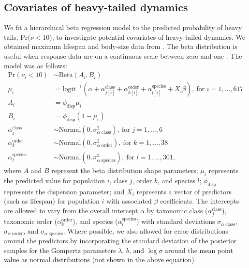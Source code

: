 \subsection{Covariates of heavy-tailed dynamics} We fit a hierarchical beta
regression model to the predicted probability of heavy tails, Pr(\(\nu < 10\)),
to investigate potential covariates of heavy-tailed dynamics. We obtained
maximum lifespan and body-size data from \citet{brook2006a}.
The beta distribution is useful when response data are on a continuous scale
between zero and one \citep{ferrari2004}. The model was as follows:
\begin{align}
\mathrm{Pr}(\nu_i < 10) &\sim \mathrm{Beta}(A_i, B_i)\\
\mu_i &= \mathrm{logit}^{-1}(\alpha
  + \alpha^\mathrm{class}_{j[i]}
  + \alpha^\mathrm{order}_{k[i]}
  + \alpha^\mathrm{species}_{l[i]}
  + X_i \beta),
  \: \text{for } i = 1, \dots, 617\\
A_i &= \phi_\mathrm{disp} \mu_i\\
B_i &= \phi_\mathrm{disp} (1 - \mu_i)\\
\alpha^\mathrm{class}_j &\sim
  \mathrm{Normal}(0, \sigma^2_{\alpha \; \mathrm{class}}),
  \: \text{for } j = 1, \dots, 6\\
\alpha^\mathrm{order}_k &\sim
  \mathrm{Normal}(0, \sigma^2_{\alpha \; \mathrm{order}}),
  \: \text{for } k = 1, \dots, 38\\
\alpha^\mathrm{species}_l &\sim
  \mathrm{Normal}(0, \sigma^2_{\alpha \; \mathrm{species}}),
  \: \text{for } l = 1, \dots, 301,
\end{align}
where \(A\) and \(B\) represent the beta distribution shape parameters;
\(\mu_i\) represents the predicted value for population \(i\), class \(j\),
order \(k\), and species \(l\); \(\phi_\mathrm{disp}\) represents the
dispersion parameter; and \(X_i\) represents a vector of predictors (such as
lifespan) for population \(i\) with associated \(\beta\) coefficients. The
intercepts are allowed to vary from the overall intercept \(\alpha\) by
taxonomic class (\(\alpha^\mathrm{class}_j\)), taxonomic order
(\(\alpha^\mathrm{order}_k\)), and species (\(\alpha^\mathrm{species}_l\)) with
standard deviations \(\sigma_{\alpha \; \mathrm{class}}\), \(\sigma_{\alpha \;
\mathrm{order}}\), and \(\sigma_{\alpha \; \mathrm{species}}\). Where possible,
we also allowed for error distributions around the predictors by incorporating
the standard deviation of the posterior samples for the Gompertz parameters
\(\lambda\), \(b\), and \(\log \sigma\) around the mean point value as normal
distributions (not shown in the above equation).

